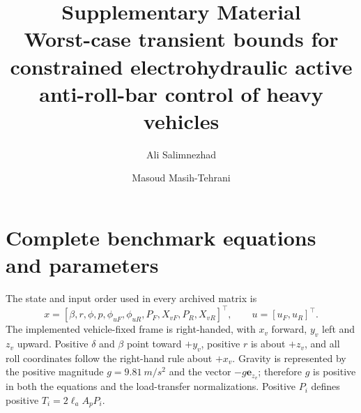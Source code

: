 \documentclass[10pt,a4paper]{article}
\title{Supplementary Material\\[1mm]
Worst-case transient bounds for constrained electrohydraulic active anti-roll-bar control of heavy vehicles}
\author{Ali Salimnezhad \and Masoud Masih-Tehrani}
\date{}
\newcommand{\finalnew}[1]{#1}
\begin{document}
\maketitle

\section{Complete benchmark equations and parameters}

The state and input order used in every archived matrix is
\begin{equation}
x=[\beta,r,\phi,p,\phi_{uF},\phi_{uR},P_F,X_{vF},P_R,X_{vR}]^\top,
\qquad u=[u_F,u_R]^\top.
\end{equation}
\finalnew{The implemented vehicle-fixed frame is right-handed, with $x_v$ forward, $y_v$ left and $z_v$ upward. Positive $\delta$ and $\beta$ point toward $+y_v$, positive $r$ is about $+z_v$, and all roll coordinates follow the right-hand rule about $+x_v$. Gravity is represented by the positive magnitude $g=\SI{9.81}{m/s^2}$ and the vector $-g\mathbf e_{z_v}$; therefore $g$ is positive in both the equations and the load-transfer normalizations. Positive $P_i$ defines positive $T_i=2\ell_aA_pP_i$.}
\end{document}
